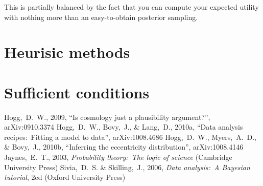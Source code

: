 \documentclass[12pt,twoside]{article}
\begin{document}
This is partially balanced by the fact that you can compute your expected utility with
  nothing more than an easy-to-obtain posterior sampling.

\section{Heurisic methods}

\section{Sufficient conditions}

\clearpage
{}\theendnotes

\clearpage
\begin{thebibliography}{}\raggedright
{}
  Hogg,~D.~W., 2009,
  ``Is cosmology just a plausibility argument?'', arXiv:0910.3374
  Hogg,~D.~W., Bovy,~J., \& Lang,~D., 2010a,
  ``Data analysis recipes:\ Fitting a model to data'', arXiv:1008.4686
  Hogg,~D.~W., Myers,~A.~D., \& Bovy,~J., 2010b,
  ``Inferring the eccentricity distribution'', arXiv:1008.4146
  Jaynes,~E.~T., 2003,
  \textit{Probability theory:\ The logic of science} (Cambridge University Press)
  Sivia,~D.~S. \& Skilling,~J., 2006,
  \textit{Data analysis:\ A Bayesian tutorial}, 2ed (Oxford University Press)
\end{thebibliography}
\end{document}
